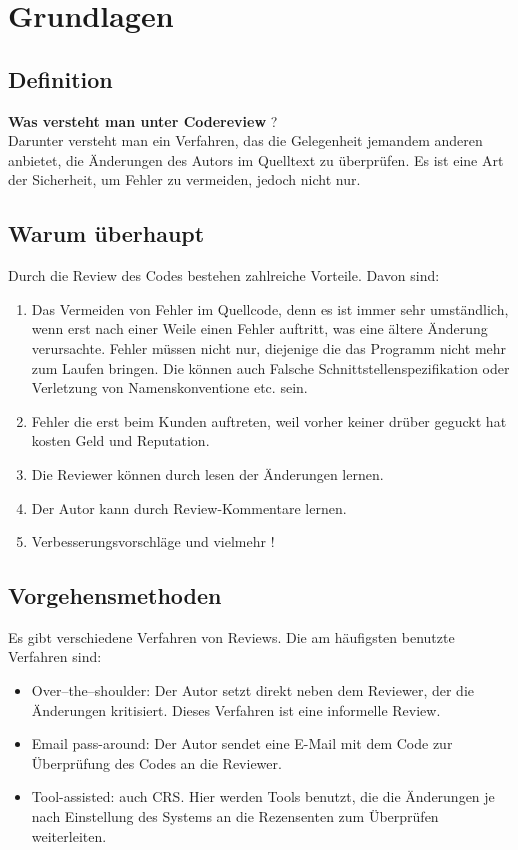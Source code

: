 \section{Grundlagen}

\subsection{Definition}
\textbf{Was versteht man unter Codereview} ?\\
Darunter versteht man ein Verfahren, das die Gelegenheit jemandem anderen anbietet, die Änderungen des Autors im Quelltext zu überprüfen.
Es ist eine Art der Sicherheit, um Fehler zu vermeiden, jedoch nicht nur.

\subsection{Warum überhaupt}
Durch die Review des Codes bestehen zahlreiche Vorteile. Davon sind:

\begin{enumerate}
	\item Das Vermeiden von Fehler im Quellcode, denn es ist immer sehr umständlich, wenn erst nach einer Weile einen Fehler auftritt, was eine ältere Änderung verursachte.
		Fehler müssen nicht nur, diejenige die das Programm nicht mehr zum Laufen bringen. Die können auch Falsche Schnittstellenspezifikation oder Verletzung von Namenskonventione 
		etc. sein.
	\item Fehler die erst beim Kunden auftreten, weil vorher keiner drüber geguckt hat kosten Geld und Reputation.
	\item Die Reviewer können durch lesen der Änderungen lernen.
	\item Der Autor kann durch Review-Kommentare lernen.
	\item Verbesserungsvorschläge und vielmehr !
\end{enumerate}

\subsection{Vorgehensmethoden}
Es gibt verschiedene Verfahren von Reviews. Die am häufigsten benutzte Verfahren sind:

\begin{itemize}
	\item Over–the–shoulder: Der Autor setzt direkt neben dem Reviewer, der die Änderungen kritisiert. Dieses Verfahren ist eine informelle Review.
	\item Email pass-around: Der Autor sendet eine E-Mail mit dem Code zur Überprüfung des Codes an die Reviewer.
	\item Tool-assisted: auch \ac{CRS}. Hier werden Tools benutzt, die die Änderungen je nach Einstellung des Systems an die Rezensenten zum Überprüfen weiterleiten.
\end{itemize}
